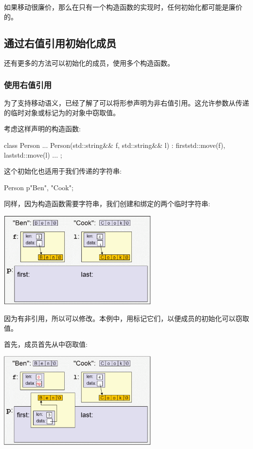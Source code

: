 如果移动很廉价，那么在只有一个构造函数的实现时，任何初始化都可能是廉价的。

\subsection{通过右值引用初始化成员}

还有更多的方法可以初始化的成员，使用多个构造函数。

\subsubsection{使用右值引用}

为了支持移动语义，已经了解了可以将形参声明为非右值引用。这允许参数从传递的临时对象或标记为的对象中窃取值。

考虑这样声明的构造函数:

\begin{cppcode}
class Person {
	...
	Person(std::string&& f, std::string&& l)
	: first{std::move(f)}, last{std::move(l)} {
	}
	...
};
\end{cppcode}

这个初始化也适用于我们传递的字符串:

\begin{cppcode}
Person p{"Ben", "Cook"};
\end{cppcode}

同样，因为构造函数需要字符串，我们创建和绑定的两个临时字符串:

\begin{center}
	\includegraphics[width=0.6\textwidth]{part1/ch4/images/8}
\end{center}

因为有非引用，所以可以修改。本例中，用标记它们，以便成员的初始化可以窃取值。

首先，成员首先从中窃取值:

\begin{center}
	\includegraphics[width=0.6\textwidth]{part1/ch4/images/9}
\end{center}

